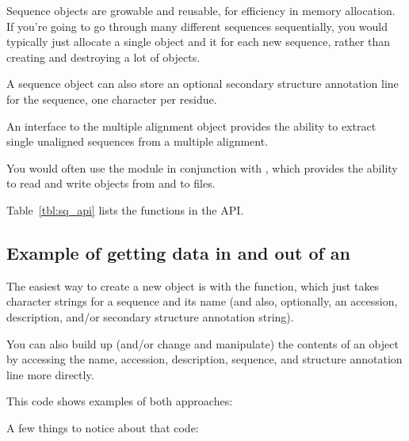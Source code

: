 Sequence objects are growable and reusable, for efficiency in memory
allocation. If you're going to go through many different sequences
sequentially, you would typically just allocate a single
 object and  it for each new
sequence, rather than creating and destroying a lot of objects.

A sequence object can also store an optional secondary structure
annotation line for the sequence, one character per residue.

An interface to the  multiple alignment object
provides the ability to extract single unaligned sequences from a
multiple alignment.

You would often use the  module in conjunction with
, which provides the ability to read and write
 objects from and to files.

Table~\ref{tbl:sq_api} lists the functions in the  API.








\subsection{Example of getting data in and out of an }

The easiest way to create a new  object is with the
 function, which just takes character
strings for a sequence and its name (and also, optionally, an
accession, description, and/or secondary structure annotation string).

You can also build up (and/or change and manipulate) the contents of
an  object by accessing the name, accession,
description, sequence, and structure annotation line more directly.

This code shows examples of both approaches:



A few things to notice about that code:

